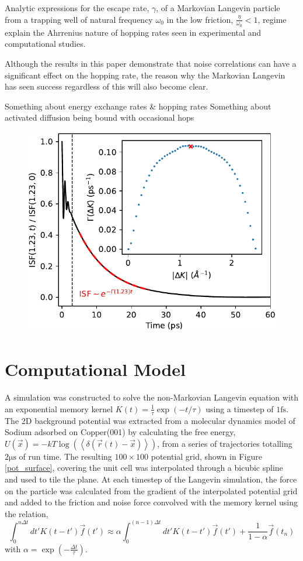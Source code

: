 \documentclass[7pt]{article}
\newcommand{\fs}{\si{\femto\second}}
\newcommand{\us}{\si{\micro\second}}
\begin{document}
Analytic expressions for the escape rate, $\gamma$, of a Markovian Langevin particle from a trapping well of natural frequency $\omega_0$ in the low friction, $\frac{\eta}{\omega_0} < 1$, regime explain the Ahrrenius nature of hopping rates seen in experimental and computational studies. 

Although the results in this paper demonstrate that noise correlations can have a significant effect on the hopping rate, the reason why the Markovian Langevin has seen success regardless of this will also become clear.

Something about energy exchange rates \& hopping rates
Something about activated diffusion being bound with occasional hops

\begin{figure}
	\centering
	\includegraphics{isf_dk}
	\caption{}
	\label{fig:isf_dk}
\end{figure}

\section{Computational Model}

A simulation was constructed to solve the non-Markovian Langevin equation with an exponential memory kernel $K(t)=\frac{1}{\tau}\exp(-t/\tau)$ using a timestep of $1\fs$. The 2D background potential was extracted from a molecular dynamics model of Sodium adsorbed on Copper(001) by calculating the free energy, $U(\vec{x}) = - kT \log(\left< \delta(\vec{r}(t)-\vec{x}) \right>)$, from a series of trajectories totalling $2 \us$ of run time. The resulting $100\times100$ potential grid, shown in Figure \ref{pot_surface},  covering the unit cell was interpolated through a bicubic spline\cite{press1992numerical} and used to tile the plane. At each timestep of the Langevin simulation, the force on the particle was calculated from the gradient of the interpolated potential grid and added to the friction and noise force convolved with the memory kernel using the relation,
$$
\int_0^{n\Delta{t}} dt' K\left(t-t'\right) \vec{f}(t') \approx \alpha \int_0^{(n-1)\Delta{t}} dt' K\left(t-t'\right) \vec{f}(t') + \frac{1}{1-\alpha} \vec{f}\left(t_n\right)
$$
with $\alpha=\exp(-\frac{\Delta{t}}{\tau})$.



\end{document}
